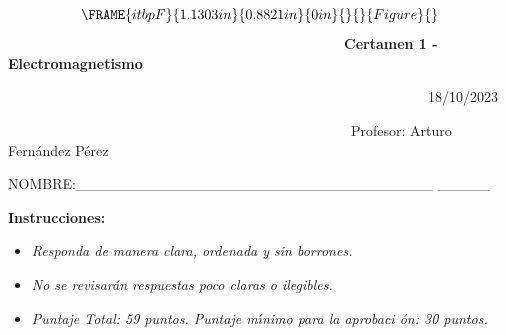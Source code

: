 \documentclass{article}
\begin{document}
\ 
\begin{equation*}
\FRAME{itbpF}{1.1303in}{0.8821in}{0in}{}{}{Figure}{\special{language
"Scientific Word";type "GRAPHIC";maintain-aspect-ratio TRUE;display
"USEDEF";valid_file "T";width 1.1303in;height 0.8821in;depth
0in;original-width 2.3531in;original-height 1.8291in;cropleft "0";croptop
"1";cropright "1";cropbottom "0";tempfilename
'S2OMC600.bmp';tempfile-properties "XPR";}}
\end{equation*}%
\ \ \ \ \ \ \ \ \ \ \ \ \ \ \ \ \ \ \ \ \ \ \ \ \ \ \ \ \ \ \ \ \ \ \ \ \ \
\ \ \ \ \ \ \ \ \ \ \textbf{Certamen 1 - Electromagnetismo}

\ \ \ \ \ \ \ \ \ \ \ \ \ \ \ \ \ \ \ \ \ \ \ \ \ \ \ \ \ \ \ \ \ \ \ \ \ \
\ \ \ \ \ \ \ \ \ \ \ \ \ \ \ \ \ \ \ \ \ \ 18/10/2023

\noindent\ \ \ \ \ \ \ \ \ \ \ \ \ \ \ \ \ \ \ \ \ \ \ \ \ \ \ \ \ \ \ \ \ \
\ \ \ \ \ \ \ \ \ \ \ \ \ \ \ Profesor: Arturo Fern\'{a}ndez P\'{e}rez 
\hspace*{\stretch{0.7500}}

\bigskip

\bigskip
NOMBRE:\_\_\_\_\_\_\_\_\_\_\_\_\_\_\_\_\_\_\_\_\_\_\_\_\_\_\_\_\_\_\_\_\_\_%
\_\_\_\_\_

\textbf{Instrucciones: }

\begin{itemize}
\item \emph{Responda de manera clara, ordenada y sin borrones. }

\item \emph{No se revisar\'{a}n respuestas poco claras o ilegibles. }

\item \emph{Puntaje Total: 59 puntos. Puntaje m\'{\i}nimo para la aprobaci%
\'{o}n: 30 puntos.}
\end{itemize}
\end{document}
